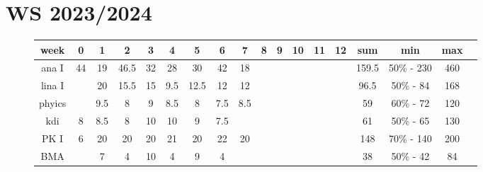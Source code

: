 \documentclass{gadsescript}
\begin{document}
\maketitle
\section{WS 2023/2024}
\begin{figure}[H]
	\begin{tabular}{|c|c|c|c|c|c|c|c|c|c|c|c|c|c|c|c|c|c|}
		\hline
		week	& 0	& 1	& 2	& 3	& 4	& 5	& 6	& 7	& 8	& 9	& 10	& 11	& 12	& sum	& min		& max	\\\hline
		ana I	& 44	& 19	& 46.5	& 32	& 28	& 30	& 42	& 18	& 	& 	& 	& 	& 	& 159.5	& 50\% - 230	& 460	\\
		lina I	&  	& 20	& 15.5	& 15	& 9.5	& 12.5	& 12	& 12	& 	& 	& 	& 	& 	& 96.5	& 50\% - 84	& 168	\\
		phyics	&	& 9.5	& 8	& 9	& 8.5	& 8	& 7.5 	& 8.5	& 	& 	& 	& 	& 	& 59	& 60\% - 72	& 120	\\
		kdi	& 8	& 8.5	& 8	& 10	& 10	& 9	& 7.5	& 	& 	& 	& 	& 	& 	& 61	& 50\% - 65	& 130	\\
		PK I	& 6	& 20	& 20	& 20	& 21	& 20	& 22	& 20	& 	& 	& 	& 	& 	& 148	& 70\% - 140	& 200	\\
		BMA	& 	& 7	& 4	& 10	& 4	& 9	& 4	& 	& 	& 	& 	& 	& 	& 38	& 50\% - 42	& 84	\\
		\hline
	\end{tabular}
\end{figure}
\end{document}
